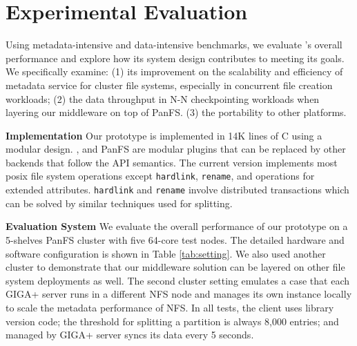 \section{Experimental Evaluation}

Using metadata-intensive and data-intensive benchmarks,
we evaluate \sys's overall performance
and explore how its system design contributes to meeting its goals.
We specifically examine: (1) its improvement on the scalability and
efficiency of metadata service for cluster file systems,
especially in concurrent file creation workloads;
(2) the data throughput in N-N checkpointing workloads
when layering our middleware on top of PanFS.
(3) the portability to other platforms.

\textbf{Implementation}
Our prototype is implemented in 14K lines of C using a modular design.
\tfs, \ldb and PanFS are modular plugins that can be replaced by other backends
that follow the API semantics. The current version implements most posix
file system operations except \texttt{hardlink}, \texttt{rename},
and operations for extended attributes.
\texttt{hardlink} and \texttt{rename} involve distributed transactions
which can be solved by similar techniques used for splitting.

\textbf{Evaluation System}
We evaluate the overall performance of our prototype on
a 5-shelves PanFS cluster with five 64-core test nodes. The detailed hardware
and software configuration is shown in Table \ref{tab:setting}.
We also used another cluster to demonstrate that our middleware solution
can be layered on other file system deployments as well.
The second cluster setting emulates a case that each GIGA+ server runs in
a different NFS node and manages its own \tfs instance locally
to scale the metadata performance of NFS.
In all tests, the client uses library version code;
the threshold for splitting a partition is always 8,000 entries;
and \tfs managed by GIGA+ server syncs its data every 5 seconds.

